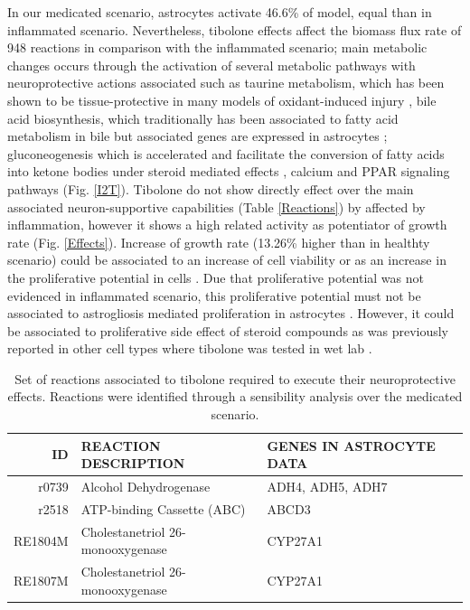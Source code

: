 In our medicated scenario, astrocytes activate 46.6\% of model, equal than in inflammated scenario. Nevertheless, tibolone effects affect the biomass flux rate of 948 reactions in comparison with the inflammated scenario; main metabolic changes occurs through the activation of several metabolic pathways with neuroprotective actions associated such as taurine metabolism, which has been shown to be tissue-protective in many models of oxidant-induced injury \cite{Schuller-Levis2003}, bile acid biosynthesis, which traditionally has been associated to fatty acid metabolism in bile \cite{Russell1992} but associated genes are expressed in astrocytes  \citep{Zhang2016}; gluconeogenesis which is accelerated and facilitate the conversion of fatty acids into ketone bodies under steroid mediated effects \cite{Amen-Ra2006}, calcium and PPAR signaling pathways (Fig. \ref{I2T}). Tibolone do not show directly effect over the main associated neuron-supportive capabilities (Table \ref{Reactions}) by affected by inflammation, however it shows a high related activity as potentiator of growth rate (Fig. \ref{Effects}). Increase of growth rate (13.26\% higher than in healthty scenario) could be associated to an increase of cell viability or as an increase in the proliferative potential in cells \cite{Feist2010}. Due that proliferative potential was not evidenced in inflammated scenario, this proliferative potential must not be associated to astrogliosis mediated proliferation in astrocytes \cite{Takuma2004}. However, it could be associated to proliferative side effect of steroid compounds as was previously reported in other cell types where tibolone was tested in wet lab \cite{Colditz1993,Colditz1995}. 
\begin{table}[h]
\caption{Set of reactions associated to tibolone required to execute their neuroprotective effects. Reactions were identified through a sensibility analysis over the medicated scenario.}
\begin{center}
\begin{tabular}{rll}
\hline
ID & REACTION DESCRIPTION & GENES IN ASTROCYTE DATA\\
\hline
\hline
r0739 & Alcohol Dehydrogenase & ADH4, ADH5, ADH7\\
r2518 & ATP-binding Cassette (ABC) & ABCD3\\
RE1804M &	Cholestanetriol 26-monooxygenase& CYP27A1 \\
RE1807M & Cholestanetriol 26-monooxygenase& CYP27A1 \\
\hline
\end{tabular}
\end{center}
\end{table}

